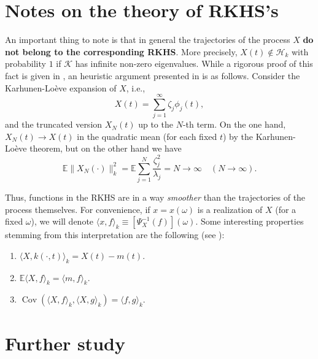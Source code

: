 \documentclass[
  a4paper,
	fontsize=11pt, %
	twoside=false, %
  secnumdepth=2,
	numbers=noenddot, %
]{kaohandt}
\DeclareMathOperator{\cov} {Cov}
\begin{document}

\appendix

\section{Notes on the theory of RKHS's}

An important thing to note is that in general the trajectories of the process \(X\) \textbf{do not belong to the corresponding RKHS}. More precisely, \(X(t)\notin \mathcal H_k\) with probability \(1\) if \(\mathcal K\) has infinite non-zero eigenvalues. While a rigorous proof of this fact is given in , an heuristic argument presented in  is as follows. Consider the Karhunen-Loève expansion of \(X\), i.e.,
\[
  X(t) = \sum_{j=1}^\infty \zeta_j \phi_j(t),
\]
and the truncated version \(X_N(t)\) up to the \(N\)-th term. On the one hand, \(X_N(t)\to X(t)\) in the quadratic mean (for each fixed \(t\)) by the Karhunen-Loève theorem, but on the other hand we have
\[
  \mathds E\|X_N(\cdot)\|^2_k = \mathds E \sum_{j=1}^N \frac{\zeta_j^2}{\lambda_j} = N \to \infty \quad (N\to\infty).
\]

Thus, functions in the RKHS are in a way \textit{smoother} than the trajectories of the process themselves. For convenience, if \(x=x(\omega)\) is a realization of \(X\) (for a fixed \(\omega\)), we will denote \(\langle x, f\rangle_k \equiv \left[\Psi_X^{-1}(f)\right](\omega)\). Some interesting properties stemming from this interpretation are the following (see ):

\begin{enumerate}

  \item \(\langle X, k(\cdot, t)\rangle_k = X(t) - m(t)\).

  \item \(\mathds{E} \langle X, f\rangle_k = \langle m, f\rangle_k\).

  \item \(\cov \left(\langle X, f \rangle_k , \langle X, g\rangle_k\right) = \langle f, g\rangle_k\).

\end{enumerate}

%

\section{Further study}
\end{document}
